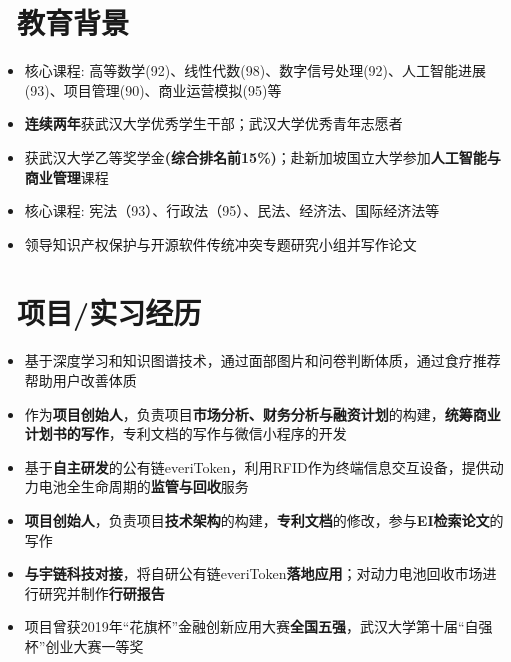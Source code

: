 \documentclass{resume}
\begin{document}
\section{\faGraduationCap\ 教育背景}
\normalsize{
\begin{itemize}
  \item 核心课程: 高等数学(92)、线性代数(98)、数字信号处理(92)、人工智能进展(93)、项目管理(90)、商业运营模拟(95)等
  \item \textbf{连续两年}获武汉大学优秀学生干部；武汉大学优秀青年志愿者
  \item 获武汉大学乙等奖学金\textbf{(综合排名前15\%)}；赴新加坡国立大学参加\textbf{人工智能与商业管理}课程
\end{itemize}
}

\begin{itemize}
    \item 核心课程: 宪法（93）、行政法（95）、民法、经济法、国际经济法等
    \item 领导知识产权保护与开源软件传统冲突专题研究小组并写作论文
\end{itemize}


\section{\faUsers\ 项目/实习经历}
\begin{itemize}
    \item 基于深度学习和知识图谱技术，通过面部图片和问卷判断体质，通过食疗推荐帮助用户改善体质
    \item 作为\textbf{项目创始人}，负责项目\textbf{市场分析、财务分析与融资计划}的构建，\textbf{统筹商业计划书的写作}，专利文档的写作与微信小程序的开发
\end{itemize}
\begin{itemize}
    \item 基于\textbf{自主研发}的公有链everiToken，利用RFID作为终端信息交互设备，提供动力电池全生命周期的\textbf{监管与回收}服务
    \item \textbf{项目创始人}，负责项目\textbf{技术架构}的构建，\textbf{专利文档}的修改，参与\textbf{EI检索论文}的写作
    \item \textbf{与宇链科技对接}，将自研公有链everiToken\textbf{落地应用}；对动力电池回收市场进行研究并制作\textbf{行研报告}
    \item 项目曾获2019年``花旗杯''金融创新应用大赛\textbf{全国五强}，武汉大学第十届``自强杯''创业大赛一等奖
\end{itemize}
\end{document}
